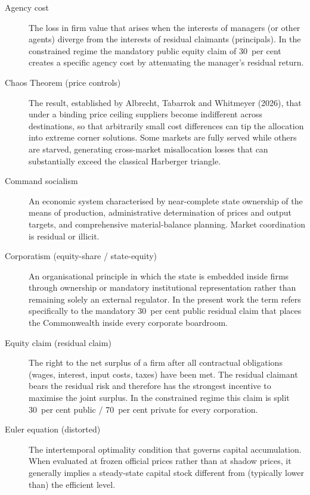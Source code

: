 \documentclass[12pt,anyside]{book}
\theoremstyle{definition}
\theoremstyle{plain}
\theoremstyle{remark}
\begin{document}
\begin{description}
\item[Agency cost]  
The loss in firm value that arises when the interests of managers (or other agents) diverge from the interests of residual claimants (principals). In the constrained regime the mandatory public equity claim of 30~per cent creates a specific agency cost by attenuating the manager’s residual return.

\item[Chaos Theorem (price controls)]  
The result, established by Albrecht, Tabarrok and Whitmeyer (2026), that under a binding price ceiling suppliers become indifferent across destinations, so that arbitrarily small cost differences can tip the allocation into extreme corner solutions. Some markets are fully served while others are starved, generating cross-market misallocation losses that can substantially exceed the classical Harberger triangle.

\item[Command socialism]  
An economic system characterised by near-complete state ownership of the means of production, administrative determination of prices and output targets, and comprehensive material-balance planning. Market coordination is residual or illicit.

\item[Corporatism (equity-share / state-equity)]  
An organisational principle in which the state is embedded inside firms through ownership or mandatory institutional representation rather than remaining solely an external regulator. In the present work the term refers specifically to the mandatory 30~per cent public residual claim that places the Commonwealth inside every corporate boardroom.

\item[Equity claim (residual claim)]  
The right to the net surplus of a firm after all contractual obligations (wages, interest, input costs, taxes) have been met. The residual claimant bears the residual risk and therefore has the strongest incentive to maximise the joint surplus. In the constrained regime this claim is split 30~per cent public / 70~per cent private for every corporation.

\item[Euler equation (distorted)]  
The intertemporal optimality condition that governs capital accumulation. When evaluated at frozen official prices rather than at shadow prices, it generally implies a steady-state capital stock different from (typically lower than) the efficient level.


\end{description}
\end{document}
